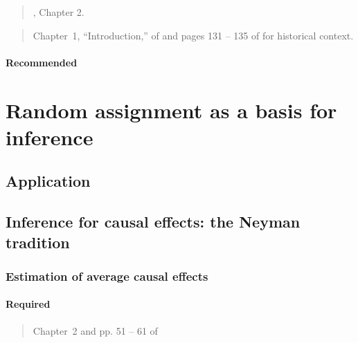 \documentclass[12pt]{article}
\begin{document}
\begin{verse} , Chapter 2. \end{verse}

\begin{verse} Chapter~1, ``Introduction,'' of  and pages 131 -- 135 of  for historical context. \end{verse}

\paragraph*{Recommended}

\begin{verse}  \end{verse}

\section{Random assignment as a basis for inference}

\subsection*{Application}

\begin{verse}  \end{verse}

\subsection{Inference for causal effects: the Neyman tradition}

\subsubsection{Estimation of average causal effects}

\paragraph*{Required}

\begin{verse} Chapter~2 and pp. 51 -- 61 of  \end{verse}
\begin{verse}  \end{verse}
\begin{verse}  \end{verse}
\end{document}
